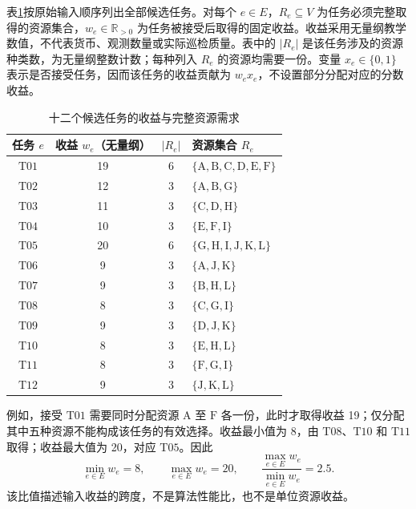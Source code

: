 表\ref{s0205:job_table}按原始输入顺序列出全部候选任务。对每个 $e\in E$，$R_e\subseteq V$ 为任务必须完整取得的资源集合，$w_e\in\mathbb R_{>0}$ 为任务被接受后取得的固定收益。收益采用无量纲教学数值，不代表货币、观测数量或实际巡检质量。表中的 $|R_e|$ 是该任务涉及的资源种类数，为无量纲整数计数；每种列入 $R_e$ 的资源均需要一份。变量 $x_e\in\{0,1\}$ 表示是否接受任务，因而该任务的收益贡献为 $w_ex_e$，不设置部分分配对应的分数收益。

\begin{table}[htbp]
 \centering
 \caption{十二个候选任务的收益与完整资源需求}
 \label{s0205:job_table}
 \begin{tabular}{cccl}
  \toprule
  任务 $e$ & 收益 $w_e$（无量纲） & $|R_e|$ & 资源集合 $R_e$\\
  \midrule
  $\mathrm{T01}$ & 19 & 6 & $\{\mathrm{A},\mathrm{B},\mathrm{C},\mathrm{D},\mathrm{E},\mathrm{F}\}$\\
  $\mathrm{T02}$ & 12 & 3 & $\{\mathrm{A},\mathrm{B},\mathrm{G}\}$\\
  $\mathrm{T03}$ & 11 & 3 & $\{\mathrm{C},\mathrm{D},\mathrm{H}\}$\\
  $\mathrm{T04}$ & 10 & 3 & $\{\mathrm{E},\mathrm{F},\mathrm{I}\}$\\
  $\mathrm{T05}$ & 20 & 6 & $\{\mathrm{G},\mathrm{H},\mathrm{I},\mathrm{J},\mathrm{K},\mathrm{L}\}$\\
  $\mathrm{T06}$ & 9 & 3 & $\{\mathrm{A},\mathrm{J},\mathrm{K}\}$\\
  $\mathrm{T07}$ & 9 & 3 & $\{\mathrm{B},\mathrm{H},\mathrm{L}\}$\\
  $\mathrm{T08}$ & 8 & 3 & $\{\mathrm{C},\mathrm{G},\mathrm{I}\}$\\
  $\mathrm{T09}$ & 9 & 3 & $\{\mathrm{D},\mathrm{J},\mathrm{K}\}$\\
  $\mathrm{T10}$ & 8 & 3 & $\{\mathrm{E},\mathrm{H},\mathrm{L}\}$\\
  $\mathrm{T11}$ & 8 & 3 & $\{\mathrm{F},\mathrm{G},\mathrm{I}\}$\\
  $\mathrm{T12}$ & 9 & 3 & $\{\mathrm{J},\mathrm{K},\mathrm{L}\}$\\
  \bottomrule
 \end{tabular}
\end{table}

例如，接受 $\mathrm{T01}$ 需要同时分配资源 $\mathrm{A}$ 至 $\mathrm{F}$ 各一份，此时才取得收益 19；仅分配其中五种资源不能构成该任务的有效选择。收益最小值为 8，由 $\mathrm{T08}$、$\mathrm{T10}$ 和 $\mathrm{T11}$ 取得；收益最大值为 20，对应 $\mathrm{T05}$。因此
\begin{equation}
 \min_{e\in E}w_e=8,\qquad
 \max_{e\in E}w_e=20,\qquad
 \frac{\max_{e\in E}w_e}{\min_{e\in E}w_e}=2.5.
 \label{s0205:weight_range}
\end{equation}
该比值描述输入收益的跨度，不是算法性能比，也不是单位资源收益。

